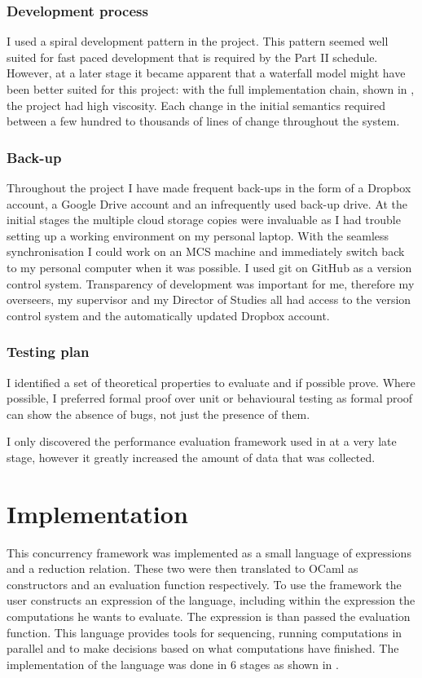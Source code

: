 \documentclass[12pt,twoside,notitlepage]{report}
\begin{document}
\subsection{Development process}
I used a spiral development pattern in the project. This pattern seemed well suited for fast paced development that is required by the Part II schedule. However, at a later stage it became apparent that a waterfall model might have been better suited for this project: with the full implementation chain, shown in , the project had high viscosity. Each change in the initial semantics required between a few hundred to thousands of lines of change throughout the system. 
\subsection{Back-up}
Throughout the project I have made frequent back-ups in the form of a Dropbox account, a Google Drive account and an infrequently used back-up drive. At the initial stages the multiple cloud storage copies were invaluable as I had trouble setting up a working environment on my personal laptop. With the seamless synchronisation I could work on an MCS machine and immediately switch back to my personal computer when it was possible.  I used git on GitHub as a version control system. Transparency of development was important for me, therefore my overseers, my supervisor and my Director of Studies all had access to the version control system and the automatically updated Dropbox account.
\subsection{Testing plan}
I identified a set of theoretical properties to evaluate and if possible prove. Where possible, I preferred formal proof over unit or behavioural testing as formal proof can show the absence of bugs, not just the presence of them. 

I only discovered the performance evaluation framework used in  at a very late stage, however it greatly increased the amount of data that was collected.

\cleardoublepage
\chapter{Implementation}
This concurrency framework was implemented as a small language of expressions and a reduction relation. These two were then translated to OCaml as constructors and an evaluation function respectively. To use the framework the user constructs an expression of the language, including within the expression the computations he wants to evaluate. The expression is than passed the evaluation function.  This language provides tools for sequencing, running computations in parallel and to make decisions based on what computations have finished. The implementation of the language was done in 6 stages as shown in . 
\end{document}
